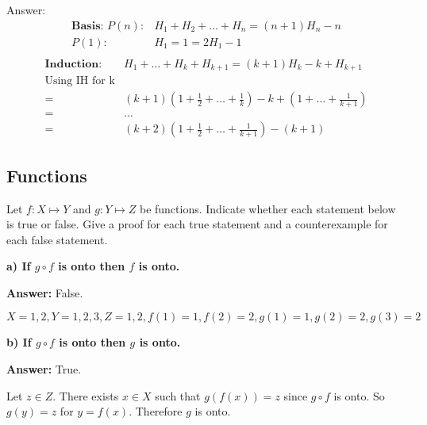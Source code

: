 \documentclass[landscape, letterpaper, 8pt]{extarticle}
\begin{document}
\begin{multicols}{3}
\begin{example}
        Answer:
        \begin{equation*}
            \begin{aligned}
                \textbf{Basis: } P(n): & H_1 + H_2 + \ldots + H_n = (n+1) H_n-n \\
                P(1):                  & H_1 = 1 = 2H_1 -1                      \\
            \end{aligned}
        \end{equation*}
        \begin{equation*}
            \begin{aligned}
                \textbf{Induction: } & H_1 + \ldots + H_k + H_{k+1} = (k+1)H_k - k + H_{k+1}                  \\
                \text{Using IH for k}                                                                         \\
                =                    & (k+1)(1+\frac{1}{2}+\ldots+\frac{1}{k})-k  +(1+\ldots + \frac{1}{k+1}) \\
                =                    & \ldots                                                                 \\
                =                    & (k+2) (1+\frac{1}{2} + \ldots + \frac{1}{k+1}) - (k+1)
            \end{aligned}
        \end{equation*}
    \end{example}
    \subsection*{Functions}
    Let $f: X \mapsto Y$ and $g: Y \mapsto Z$ be functions. Indicate whether each statement below is true or false. Give a proof for each true statement and a counterexample for each false statement.

    \textbf{a) If $g \circ f$ is onto then $f$ is onto.}

    \textbf{Answer: } False.

    $X = {1, 2}, Y = {1, 2, 3}, Z = {1, 2}, f(1) = 1, f(2) = 2, g(1) = 1, g(2) = 2, g(3) = 2$

    \textbf{b) If $g \circ f$ is onto then $g$ is onto.}

    \textbf{Answer: } True.

    Let $z \in Z$. There exists $x \in X$ such that $g(f(x)) = z$ since $g \circ f$ is onto. So $g(y) = z$ for $y = f(x)$. Therefore $g$ is onto.


\end{multicols}
\end{document}

